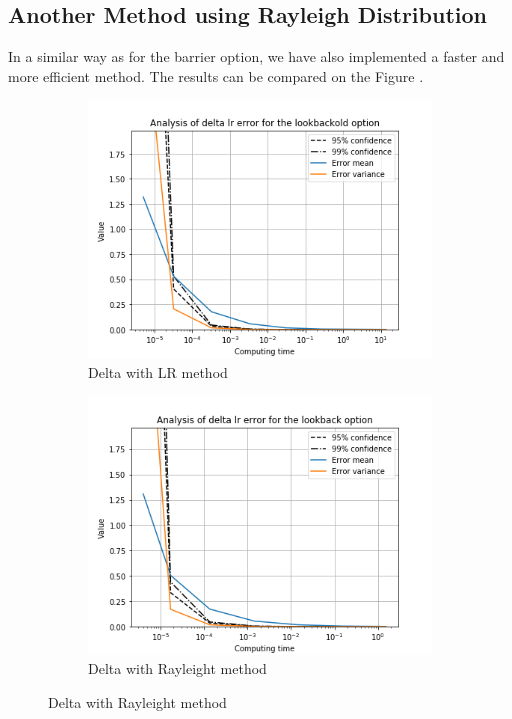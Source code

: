 \documentclass[11pt,a4paper,fleqn]{article}
\begin{document}
\subsection{Another Method using Rayleigh Distribution}
 In a similar way as for the barrier option, we have also implemented a faster and more efficient method. The results can be compared on the Figure \cite{fig:lboptiongraphs}.

 \begin{figure}[h!]
   \centering
      \begin{subfigure}[b]{0.45\textwidth}
           \includegraphics[width=\textwidth]{graphs/lookbackolddeltalrtime.png}
           \caption{Delta with LR method}
       \end{subfigure}
       \begin{subfigure}[b]{0.45\textwidth}
           \includegraphics[width=\textwidth]{graphs/lookbackdeltalrtime.png}
           \caption{Delta with Rayleight method}
       \end{subfigure}


\end{figure}
\end{document}
